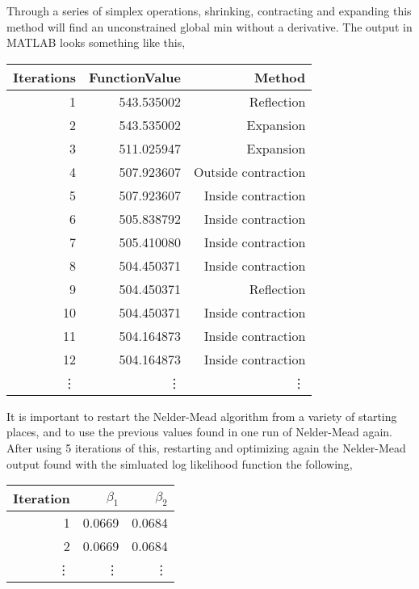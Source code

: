 \documentclass[]{article}
\begin{document}


Through a series of simplex operations, shrinking, contracting and expanding this method will find an unconstrained global min without a derivative. The output in MATLAB looks something like this, 
\begin{table}[H]
	\centering 
\begin{tabular}{rrr}
	Iterations & FunctionValue & Method\\
	\hline 
	\hline 
	1 & 543.535002 & Reflection \\
	2 & 543.535002 & Expansion \\
	3 & 511.025947 & Expansion \\
	4 & 507.923607 & Outside contraction \\
	5 & 507.923607 & Inside  contraction \\
	6 & 505.838792 & Inside  contraction \\
	7 & 505.410080 & Inside  contraction \\
	8 & 504.450371 & Inside  contraction \\
	9 & 504.450371 & Reflection \\
	10 & 504.450371 & Inside  contraction \\
	11 & 504.164873 & Inside  contraction \\
	12 & 504.164873 & Inside  contraction \\
	\vdots & \vdots & \vdots \\
	\hline 
	\hline 
\end{tabular}
\end{table}

It is important to restart the Nelder-Mead algorithm from a variety of starting places, and to use the previous values found in one run of Nelder-Mead again. After using 5 iterations of this, restarting and optimizing again the Nelder-Mead output found with the simluated log likelihood function the following, 

\begin{table}[H]
	\centering 
	\begin{tabular}{rrr}
			Iteration  & $ \beta_1 $ & $ \beta_2 $ \\
			\hline \hline 
			  1 & 0.0669 & 0.0684 \\
			  2 & 0.0669 & 0.0684 \\
			  \vdots & \vdots & \vdots \\ 
	\end{tabular}
\end{table}
\end{document}
